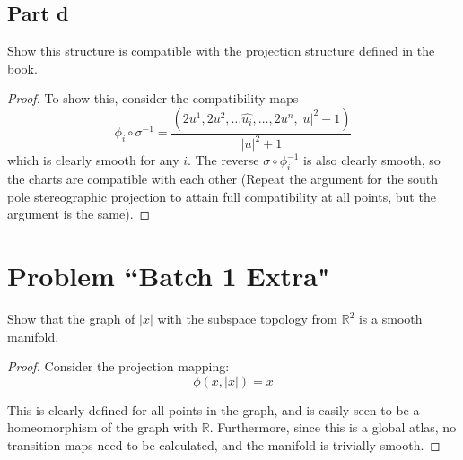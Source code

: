 \documentclass[fontsize=11pt]{scrartcl} %
\numberwithin{equation}{section} %
\numberwithin{figure}{section} %
\numberwithin{table}{section} %
\begin{document}
\subsection*{Part d}
Show this structure is compatible with the projection structure defined in the book.
\\
\begin{proof}
To show this, consider the compatibility maps
\[
\phi_i\circ\sigma^{-1} = \frac{(2u^1,2u^2,\ldots\hat{u_i},\ldots,2u^n,|u|^2-1)}{|u|^2+1}
\]
which is clearly smooth for any $i$. The reverse $\sigma\circ\phi_i^{-1}$ is also clearly
smooth, so the charts are compatible with each other (Repeat the argument for the south
pole stereographic projection to attain full compatibility at all points, but the argument
is the same).
\end{proof}

\section*{Problem ``Batch 1 Extra"}
Show that the graph of $|x|$ with the subspace topology from $\mathbb{R}^2$ is a smooth manifold.
\\
\begin{proof}
Consider the projection mapping:
\[
\phi(x,|x|) = x
\]

This is clearly defined for all points in the graph, and is easily seen to be a homeomorphism 
of the graph with $\mathbb{R}$. Furthermore, since this is a global atlas, no transition maps
need to be calculated, and the manifold is trivially smooth.
\end{proof}
\end{document}
